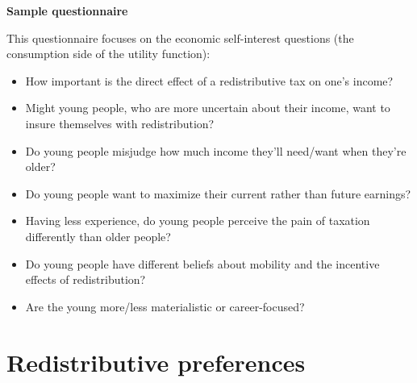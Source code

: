 \documentclass[11pt, headsepline]{article}
\begin{document}
\begin{center}
    \textbf{\LARGE Sample questionnaire}
\end{center}

This questionnaire focuses on the economic self-interest questions (the consumption side of the utility function):
\begin{itemize}
    \item How important is the direct effect of a redistributive tax on one's income?
    \item Might young people, who are more uncertain about their income, want to insure themselves with redistribution?
    \item Do young people misjudge how much income they'll need/want when they're older?
    \item Do young people want to maximize their current rather than future earnings?
    \item Having less experience, do young people perceive the pain of taxation differently than older people?
    \item Do young people have different beliefs about mobility and the incentive effects of redistribution?
    \item Are the young more/less materialistic or career-focused?
\end{itemize}

\section{Redistributive preferences}
\end{document}
